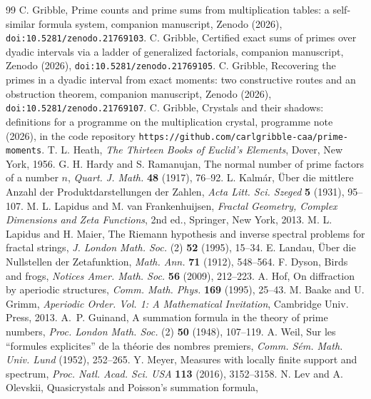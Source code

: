\documentclass[11pt]{article}
\theoremstyle{remark}
\begin{document}
\begin{thebibliography}{99}
 C. Gribble, Prime counts and prime sums from multiplication tables: a
self-similar formula system, companion manuscript, Zenodo (2026), \texttt{doi:10.5281/zenodo.21769103}.
 C. Gribble, Certified exact sums of primes over dyadic intervals via a ladder
of generalized factorials, companion manuscript, Zenodo (2026), \texttt{doi:10.5281/zenodo.21769105}.
 C. Gribble, Recovering the primes in a dyadic interval from exact moments: two
constructive routes and an obstruction theorem, companion manuscript, Zenodo (2026),
\texttt{doi:10.5281/zenodo.21769107}.
 C. Gribble, Crystals and their shadows: definitions for a programme on the
multiplication crystal, programme note (2026), in the code repository
\texttt{https://github.com/carlgribble-caa/prime-moments}.
 T. L. Heath, \emph{The Thirteen Books of Euclid's Elements}, Dover, New York, 1956.
 G. H. Hardy and S. Ramanujan, The normal number of prime factors of a number
$n$, \emph{Quart. J. Math.} \textbf{48} (1917), 76--92.
 L. Kalm\'ar, \"Uber die mittlere Anzahl der Produktdarstellungen der Zahlen,
\emph{Acta Litt. Sci. Szeged} \textbf{5} (1931), 95--107.
 M. L. Lapidus and M. van Frankenhuijsen, \emph{Fractal Geometry, Complex
Dimensions and Zeta Functions}, 2nd ed., Springer, New York, 2013.
 M. L. Lapidus and H. Maier, The Riemann hypothesis and inverse spectral
problems for fractal strings, \emph{J. London Math. Soc.} (2) \textbf{52} (1995), 15--34.
 E. Landau, \"Uber die Nullstellen der Zetafunktion, \emph{Math. Ann.}
\textbf{71} (1912), 548--564.
 F. Dyson, Birds and frogs, \emph{Notices Amer. Math. Soc.} \textbf{56} (2009),
212--223.
 A. Hof, On diffraction by aperiodic structures, \emph{Comm. Math. Phys.}
\textbf{169} (1995), 25--43.
 M. Baake and U. Grimm, \emph{Aperiodic Order. Vol. 1: A Mathematical
Invitation}, Cambridge Univ. Press, 2013.
 A.~P. Guinand, A summation formula in the theory of prime numbers, \emph{Proc.
London Math. Soc.} (2) \textbf{50} (1948), 107--119.
 A. Weil, Sur les ``formules explicites'' de la th\'eorie des nombres premiers,
\emph{Comm. S\'em. Math. Univ. Lund} (1952), 252--265.
 Y. Meyer, Measures with locally finite support and spectrum, \emph{Proc. Natl.
Acad. Sci. USA} \textbf{113} (2016), 3152--3158.
 N. Lev and A. Olevskii, Quasicrystals and Poisson's summation formula,

\end{thebibliography}
\end{document}
